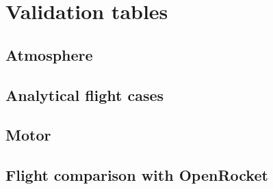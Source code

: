 \section{Validation tables}\label{app:validation}

\subsection{Atmosphere}
\subsection{Analytical flight cases}
\subsection{Motor}
\subsection{Flight comparison with OpenRocket}
